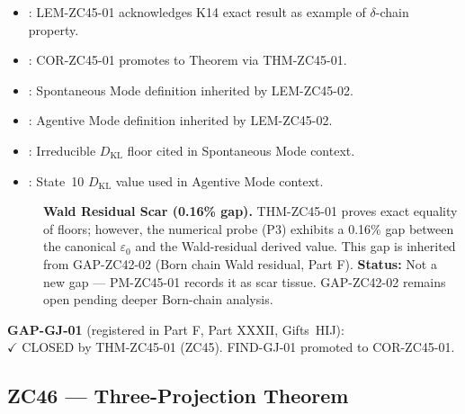 \documentclass[12pt, a4paper]{article}
\begin{document}
\begin{inheritbox}[title={ZC45 Backward Inheritance}]
\begin{itemize}[leftmargin=1.5em]
\item {}: LEM-ZC45-01
  acknowledges K14 exact result as example of $\delta$-chain property.
\item {}: COR-ZC45-01
  promotes to Theorem via THM-ZC45-01.
\item {}: Spontaneous Mode
  definition inherited by LEM-ZC45-02.
\item {}: Agentive Mode
  definition inherited by LEM-ZC45-02.
\item {}: Irreducible $D_{\mathrm{KL}}$
  floor cited in Spontaneous Mode context.
\item {}: State~10
  $D_{\mathrm{KL}}$ value used in Agentive Mode context.
\end{itemize}
\end{inheritbox}

\begin{correctionbox}[title={ZC45 Forward Corrections / Phase Misalignments}]
\begin{description}
\item[] \textbf{Wald Residual Scar (0.16\% gap).}
  THM-ZC45-01 proves exact equality of floors; however, the numerical
  probe (P3) exhibits a 0.16\% gap between the canonical $\varepsilon_0$
  and the Wald-residual derived value. This gap is inherited from
  GAP-ZC42-02 (Born chain Wald residual, Part F).
  \textbf{Status:} Not a new gap --- PM-ZC45-01 records it as scar
  tissue. GAP-ZC42-02 remains open pending deeper Born-chain analysis.
\end{description}
\end{correctionbox}

\begin{conmapbox}[title={ZC45 Closure Record}]
\textbf{GAP-GJ-01} (registered in Part F, Part XXXII, Gifts~HIJ):\\
\textcolor{crfgreen}{$\checkmark$ CLOSED} by THM-ZC45-01 (ZC45).
FIND-GJ-01 promoted to COR-ZC45-01.
\end{conmapbox}

\subsection{ZC46 --- Three-Projection Theorem}
\end{document}
